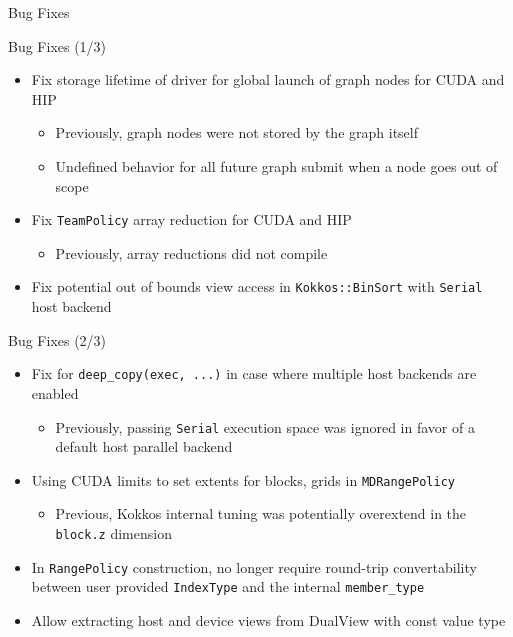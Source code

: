 
\begin{frame}[fragile]

  {\Huge Bug Fixes}

  \vspace{10pt}

\end{frame}



\begin{frame}[fragile]{Bug Fixes (1/3)}
  \begin{itemize}
    \item Fix storage lifetime of driver for global launch of graph nodes for CUDA and HIP
    \begin{itemize} 
      \item Previously, graph nodes were not stored by the graph itself
      \item Undefined behavior for all future graph submit when a node goes out of scope
    \end{itemize}
    \item Fix \texttt{TeamPolicy} array reduction for CUDA and HIP
    \begin{itemize} 
      \item[] Previously, array reductions did not compile
    \end{itemize}
    \item Fix potential out of bounds view access in \texttt{Kokkos::BinSort} with \texttt{Serial} host backend
  \end{itemize}
\end{frame}

\begin{frame}[fragile]{Bug Fixes (2/3)}
  \begin{itemize}
    \item Fix for \texttt{deep\_copy(exec, ...)} in case where multiple host backends are enabled
    \begin{itemize} \item[] Previously, passing \texttt{Serial} execution space was ignored in favor of a default host parallel backend  \end{itemize}
    \item Using CUDA limits to set extents for blocks, grids in \texttt{MDRangePolicy}
    \begin{itemize} \item[] Previous, Kokkos internal tuning was potentially overextend in the \texttt{block.z} dimension \end{itemize}
    \item In \texttt{RangePolicy} construction, no longer require round-trip convertability between user provided \texttt{IndexType} and the internal \texttt{member\_type}
    \item Allow extracting host and device views from DualView with const value type
  \end{itemize}
\end{frame}

